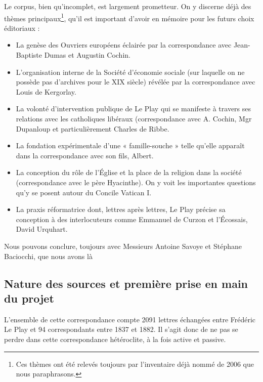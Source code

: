 Le corpus, bien qu'incomplet, est largement prometteur. On y discerne déjà des thèmes principaux\footnote{Ces thèmes ont été relevés toujours par l'inventaire déjà nommé de 2006 que nous paraphrasons.}, qu'il est important d'avoir en mémoire pour les futurs choix éditoriaux :

\begin{itemize}
    \item La genèse des Ouvriers européens éclairée par la correspondance avec Jean-Baptiste Dumas et Augustin Cochin.
    \item L'organisation interne de la Société d'économie sociale (sur laquelle on ne possède pas d'archives pour le XIX siècle) révélée par la correspondance avec Louis de Kergorlay.
    \item La volonté d'intervention publique de Le Play qui se manifeste à travers ses relations avec les catholiques libéraux (correspondance avec A. Cochin, Mgr Dupanloup et particulièrement Charles de Ribbe.
    \item La fondation expérimentale d'une « famille-souche » telle qu'elle apparaît dans la correspondance avec son fils, Albert.
    \item La conception du rôle de l'Église et la place de la religion dans la société (correspondance avec le père Hyacinthe). On y voit les importantes questions qu'y se posent autour du Concile Vatican I.
    \item La praxis réformatrice dont, lettres après lettres, Le Play précise sa conception à des interlocuteurs comme Emmanuel de Curzon et l'Écossais, David Urquhart.
\end{itemize}

Nous pouvons conclure, toujours avec Messieurs Antoine Savoye et Stéphane Baciocchi, que nous avons là 

\subsection{Nature des sources et première prise en main du projet}

L'ensemble de cette correspondance compte 2091 lettres échangées entre Frédéric Le Play et 94 correspondants entre 1837 et 1882.
Il s'agit donc de ne pas se perdre dans cette correspondance hétéroclite, à la fois active et passive.

